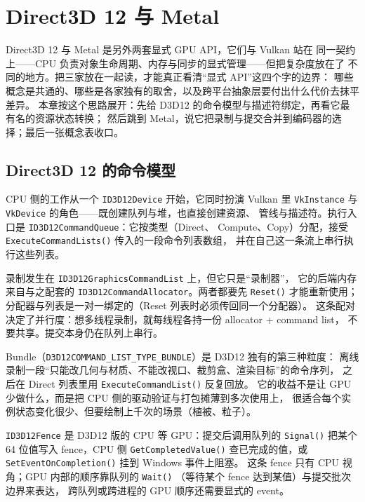 \documentclass[12pt,a4paper,fontset=fandol]{ctexbook}
\newcommand{\Fn}[1]{\texttt{#1()}}
\newcommand{\Tp}[1]{\texttt{#1}}
\newcommand{\Bk}{\discretionary{}{}{}}
\newcommand{\Lang}[1]{\textsf{#1}}
\newcommand{\DomCPU}{\Lang{CPU}}
\newcommand{\DomGPU}{\Lang{GPU}}
\begin{document}
\chapter{Direct3D 12 与 Metal}
\label{ch:ch10-d3d12-metal}

\Lang{Direct3D 12} 与 \Lang{Metal} 是另外两套显式 \DomGPU{} API，它们与 Vulkan 站在
同一契约上——\DomCPU{} 负责对象生命周期、内存与同步的显式管理——但把复杂度放在了
不同的地方。把三家放在一起读，才能真正看清``显式 API''这四个字的边界：
哪些概念是共通的、哪些是各家独有的取舍，以及跨平台抽象层要付出什么代价去抹平差异。
本章按这个思路展开：先给 D3D12 的命令模型与描述符绑定，再看它最有名的资源状态转换；
然后跳到 Metal，说它把录制与提交合并到编码器的选择；最后一张概念表收口。

\section{Direct3D 12 的命令模型}

\DomCPU{} 侧的工作从一个 \Tp{ID3D12\Bk Device} 开始，它同时扮演 Vulkan 里
\Tp{Vk\Bk Instance} 与 \Tp{Vk\Bk Device} 的角色——既创建队列与堆，也直接创建资源、
管线与描述符。执行入口是 \Tp{ID3D12\Bk Command\Bk Queue}：它按类型（Direct、
Compute、Copy）分配，接受 \Fn{Execute\Bk Command\Bk Lists} 传入的一段命令列表数组，
并在自己这一条流上串行执行这些列表。

录制发生在 \Tp{ID3D12\Bk Graphics\Bk Command\Bk List} 上，但它只是``录制器''，
它的后端内存来自与之配套的 \Tp{ID3D12\Bk Command\Bk Allocator}。两者都要先
\Fn{Reset} 才能重新使用；分配器与列表是一对一绑定的（Reset 列表时必须传回同一个分配器）。
这条配对决定了并行度：想多线程录制，就每线程各持一份 allocator + command list，
不要共享。提交本身仍在队列上串行。

Bundle（\Tp{D3D12\Bk COMMAND\_LIST\_TYPE\_BUNDLE}）是 D3D12 独有的第三种粒度：
离线录制一段``只能改几何与材质、不能改视口、裁剪盒、渲染目标''的命令序列，
之后在 Direct 列表里用 \Fn{Execute\Bk Command\Bk List} 反复回放。
它的收益不是让 \DomGPU{} 少做什么，而是把 \DomCPU{} 侧的驱动验证与打包摊薄到多次使用上，
很适合每个实例状态变化很少、但要绘制上千次的场景（植被、粒子）。

\Tp{ID3D12\Bk Fence} 是 D3D12 版的 \DomCPU{} 等 \DomGPU{}：提交后调用队列的
\Fn{Signal} 把某个 64 位值写入 fence，\DomCPU{} 侧 \Fn{Get\Bk Completed\Bk Value}
查已完成的值，或 \Fn{Set\Bk Event\Bk On\Bk Completion} 挂到 Windows 事件上阻塞。
这条 fence 只有 \DomCPU{} 视角；\DomGPU{} 内部的顺序靠队列的 \Fn{Wait}
（等待某个 fence 达到某值）与提交批次边界来表达，
跨队列或跨进程的 \DomGPU{} 顺序还需要显式的 event。
\end{document}
